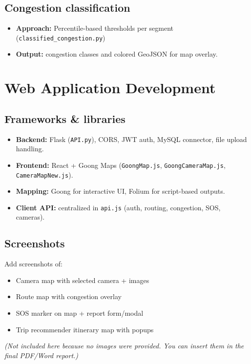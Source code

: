 \subsection{Congestion classification}
\begin{itemize}
  \item \textbf{Approach:} Percentile-based thresholds per segment (\texttt{classified\_congestion.py})
  \item \textbf{Output:} congestion classes and colored GeoJSON for map overlay.
\end{itemize}

\section{Web Application Development}

\subsection{Frameworks \& libraries}
\begin{itemize}
  \item \textbf{Backend:} Flask (\texttt{API.py}), CORS, JWT auth, MySQL connector, file upload handling.
  \item \textbf{Frontend:} React + Goong Maps (\texttt{GoongMap.js}, \texttt{GoongCameraMap.js}, \texttt{CameraMapNew.js}).
  \item \textbf{Mapping:} Goong for interactive UI, Folium for script-based outputs.
  \item \textbf{Client API:} centralized in \texttt{api.js} (auth, routing, congestion, SOS, cameras).
\end{itemize}

\subsection{Screenshots}
Add screenshots of:
\begin{itemize}
  \item Camera map with selected camera + images
  \item Route map with congestion overlay
  \item SOS marker on map + report form/modal
  \item Trip recommender itinerary map with popups
\end{itemize}

\noindent\textit{(Not included here because no images were provided. You can insert them in the final PDF/Word report.)}

